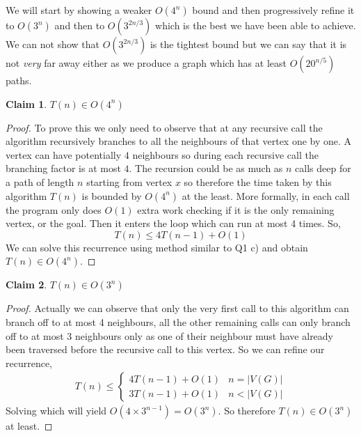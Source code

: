 \documentclass[answers]{exam}
\newtheorem{claim}{Claim}
\begin{document}
\begin{questions}
\begin{solution}
We will start by showing a weaker $O(4^n)$ bound and then progressively refine it to $O(3^n)$ and then to $O(3^{2n/3})$ which is the best we have been able to achieve. We can not show that $O(3^{2n/3})$ is the tightest bound but we can say that it is not \emph{very} far away either as we produce a graph which has at least $O(20^{n/5})$ paths.
\begin{claim}
$T(n) \in O(4^n)$
\end{claim}
\begin{proof}
To prove this we only need to observe that at any recursive call the algorithm recursively branches to all the neighbours of that vertex one by one. A vertex can have potentially $4$ neighbours so during each recursive call the branching factor is at most $4$. The recursion could be as much as $n$ calls deep for a path of length $n$ starting from vertex $x$ so therefore the time taken by this algorithm $T(n)$ is bounded by $O(4^n)$ at the least. More formally, in each call the program only does $O(1)$ extra work checking if it is the only remaining vertex, or the goal. Then it enters the loop which can run at most 4 times. So,
\[
    T(n) \leq 4 T(n-1) + O(1)
\]
We can solve this recurrence using method similar to Q1 c) and obtain $T(n) \in O(4^n)$.
\end{proof}

\begin{claim}
$T(n) \in O(3^n)$
\end{claim}
\begin{proof}
Actually we can observe that only the very first call to this algorithm can branch off to at most 4 neighbours, all the other remaining calls can only branch off to at most 3 neighbours only as one of their neighbour must have already been traversed before the recursive call to this vertex. So we can refine our recurrence,
\begin{align*}
    T(n) \leq \begin{cases}
        4 T(n-1) + O(1) & n = |V(G)|\\
        3 T(n-1) + O(1) & n < |V(G)|
    \end{cases}
\end{align*}
Solving which will yield $O(4 \times 3^{n-1}) = O(3^n)$. So therefore $T(n) \in O(3^n)$ at least.
\end{proof}


\end{solution}
\end{questions}
\end{document}
